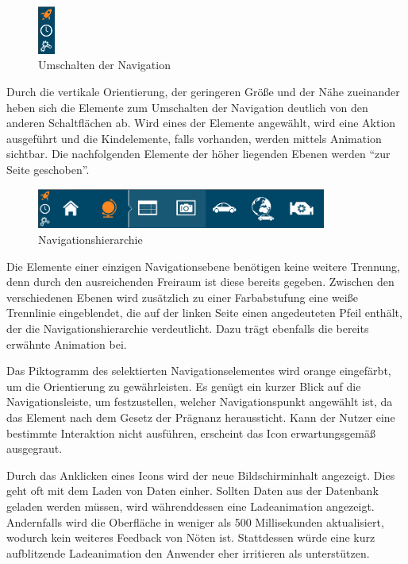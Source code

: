 \begin{figure}[H]
 \centering
 \includegraphics[width=0.05\textwidth]{grafiken/ribbon.png}
 \caption{Umschalten der Navigation}
 \label{fig:ribbon}
\end{figure}
Durch die vertikale Orientierung, der geringeren Größe und der Nähe zueinander heben sich die Elemente zum Umschalten der Navigation deutlich von den anderen Schaltflächen ab. Wird eines der Elemente angewählt, wird eine Aktion ausgeführt und die Kindelemente, falls vorhanden, werden mittels Animation sichtbar. Die nachfolgenden Elemente der höher liegenden Ebenen werden \enquote{zur Seite geschoben}.\par
\begin{figure}[H]
 \centering
 \includegraphics[width=0.85\textwidth]{grafiken/navi.png}
 \caption{Navigationshierarchie}
 \label{fig:navi}
\end{figure}
Die Elemente einer einzigen Navigationsebene benötigen keine weitere Trennung, denn durch den ausreichenden Freiraum ist diese bereits gegeben. Zwischen den verschiedenen Ebenen wird zusätzlich zu einer Farbabstufung eine weiße Trennlinie eingeblendet, die auf der linken Seite einen angedeuteten Pfeil enthält, der die Navigationshierarchie verdeutlicht. Dazu trägt ebenfalls die bereits erwähnte Animation bei.\par
Das Piktogramm des selektierten Navigationselementes wird orange eingefärbt, um die Orientierung zu gewährleisten. Es genügt ein kurzer Blick auf die Navigationsleiste, um festzustellen, welcher Navigationspunkt angewählt ist, da das Element nach dem Gesetz der Prägnanz heraussticht. Kann der Nutzer eine bestimmte Interaktion nicht ausführen, erscheint das Icon erwartungsgemäß ausgegraut.\par
Durch das Anklicken eines Icons wird der neue Bildschirminhalt angezeigt. Dies geht oft mit dem Laden von Daten einher. Sollten Daten aus der Datenbank geladen werden müssen, wird währenddessen eine Ladeanimation angezeigt. Andernfalls wird die Oberfläche in weniger als 500 Millisekunden aktualisiert, wodurch kein weiteres Feedback von Nöten ist. Stattdessen würde eine kurz aufblitzende Ladeanimation den Anwender eher irritieren als unterstützen.\par
